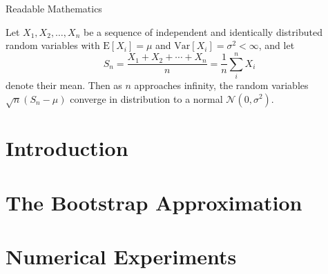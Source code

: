 \documentclass{beamer}
\begin{document}
\begin{frame}{Readable Mathematics}

Let $X_1, X_2, \ldots, X_n$ be a sequence of independent and identically distributed random variables with $\text{E}[X_i] = \mu$ and $\text{Var}[X_i] = \sigma^2 < \infty$, and let
$$S_n = \frac{X_1 + X_2 + \cdots + X_n}{n}
      = \frac{1}{n}\sum_{i}^{n} X_i$$
denote their mean. Then as $n$ approaches infinity, the random variables $\sqrt{n}(S_n - \mu)$ converge in distribution to a normal $\mathcal{N}(0, \sigma^2)$.

\end{frame}

\section{Introduction}

\section{The Bootstrap Approximation}

\section{Numerical Experiments}
\end{document}
